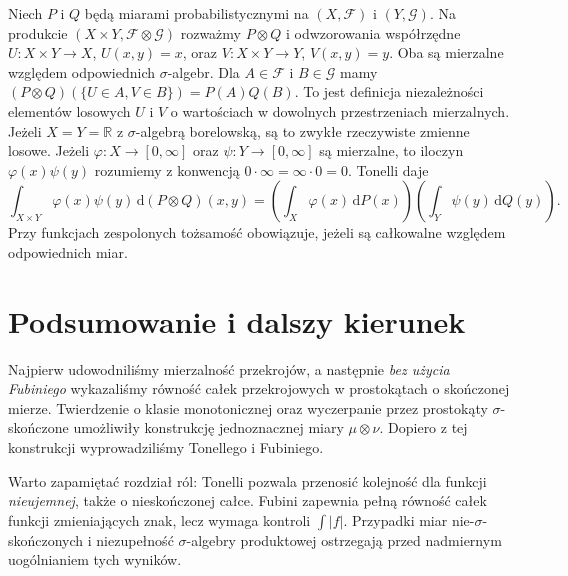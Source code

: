 \begin{przyklad}
Niech $P$ i $Q$ będą miarami probabilistycznymi
na $(X,\mathcal F)$ i $(Y,\mathcal G)$.
Na produkcie $(X\times Y,\mathcal F\otimes\mathcal G)$
rozważmy $P\otimes Q$ i odwzorowania współrzędne
$U:X\times Y\to X$, $U(x,y)=x$, oraz
$V:X\times Y\to Y$, $V(x,y)=y$.
Oba są mierzalne względem odpowiednich $\sigma$-algebr.
Dla $A\in\mathcal F$ i $B\in\mathcal G$
mamy
$(P\otimes Q)(\{U\in A,V\in B\})=P(A)Q(B)$.
To jest definicja niezależności elementów losowych
$U$ i $V$ o wartościach w dowolnych przestrzeniach mierzalnych.
Jeżeli $X=Y=\mathbb R$ z $\sigma$-algebrą borelowską,
są to zwykłe rzeczywiste zmienne losowe. Jeżeli $\varphi:X\to[0,\infty]$ oraz
$\psi:Y\to[0,\infty]$ są mierzalne, to
iloczyn $\varphi(x)\psi(y)$ rozumiemy z konwencją
$0\cdot\infty=\infty\cdot0=0$. Tonelli daje
\[
\int_{X\times Y}\varphi(x)\psi(y)
\,\mathrm d(P\otimes Q)(x,y)
=\left(\int_X\varphi(x)\,\mathrm dP(x)\right)
\left(\int_Y\psi(y)\,\mathrm dQ(y)\right).
\]
Przy funkcjach zespolonych tożsamość obowiązuje,
jeżeli są całkowalne względem odpowiednich miar.
\end{przyklad}

\section{Podsumowanie i dalszy kierunek}
Najpierw udowodniliśmy mierzalność przekrojów,
a następnie \emph{bez użycia Fubiniego} wykazaliśmy
równość całek przekrojowych w prostokątach o
skończonej mierze. Twierdzenie o klasie monotonicznej
oraz wyczerpanie przez prostokąty $\sigma$-skończone
umożliwiły konstrukcję jednoznacznej miary
$\mu\otimes\nu$. Dopiero z tej konstrukcji
wyprowadziliśmy Tonellego i Fubiniego.

Warto zapamiętać rozdział ról: Tonelli pozwala
przenosić kolejność dla funkcji \emph{nieujemnej},
także o nieskończonej całce. Fubini zapewnia
pełną równość całek funkcji zmieniających znak,
lecz wymaga kontroli $\int|f|$. Przypadki
miar nie-$\sigma$-skończonych i niezupełność
$\sigma$-algebry produktowej ostrzegają przed
nadmiernym uogólnianiem tych wyników.

